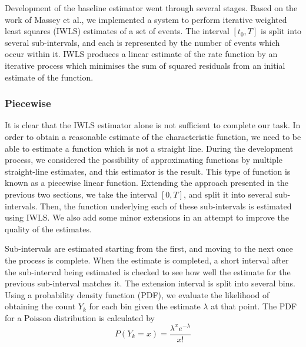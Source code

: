 \documentclass[11pt]{article}
\begin{document}
   Development of the baseline estimator went through several stages. Based on
   the work of Massey et al.\cite{massey}, we implemented a system to perform
   iterative weighted least squares (IWLS) estimates of a set of events. The
   interval $[t_0,T]$ is split into several sub-intervals, and each is
   represented by the number of events which occur within it. IWLS produces a
   linear estimate of the rate function by an iterative process which minimises
   the sum of squared residuals from an initial estimate of the function. 
\subsubsection{Piecewise}
\label{sec-4.1.1}

    It is clear that the IWLS estimator alone is not sufficient to complete our
    task. In order to obtain a reasonable estimate of the characteristic
    function, we need to be able to estimate a function which is not a straight
    line. During the development process, we considered the possibility of
    approximating functions by multiple straight-line estimates, and this
    estimator is the result. This type of function is known as a piecewise
    linear function. Extending the approach presented in the previous two
    sections, we take the interval $[0,T]$, and split it into several
    sub-intervals. Then, the function underlying each of these sub-intervals is
    estimated using IWLS. We also add some minor extensions in an attempt to
    improve the quality of the estimates.

    Sub-intervals are estimated starting from the first, and moving to the next
    once the process is complete. When the estimate is completed, a short
    interval after the sub-interval being estimated is checked to see how well
    the estimate for the previous sub-interval matches it. The extension
    interval is split into several bins. Using a probability density function
    (PDF), we evaluate the likelihood of obtaining the count $Y_k$ for each bin
    given the estimate $\lambda$ at that point. The PDF for a Poisson
    distribution is calculated by
    \begin{equation}
    P(Y_k=x)=\frac{\lambda^xe^{-\lambda}}{x!}
    \end{equation}
    
\end{document}
